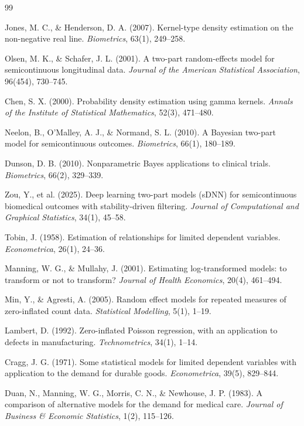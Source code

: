 \begin{thebibliography}{99}

Jones, M. C., \& Henderson, D. A. (2007). Kernel-type density estimation on the non-negative real line. \emph{Biometrics}, 63(1), 249--258.

Olsen, M. K., \& Schafer, J. L. (2001). A two-part random-effects model for semicontinuous longitudinal data. \emph{Journal of the American Statistical Association}, 96(454), 730--745.

Chen, S. X. (2000). Probability density estimation using gamma kernels. \emph{Annals of the Institute of Statistical Mathematics}, 52(3), 471--480.

Neelon, B., O'Malley, A. J., \& Normand, S. L. (2010). A Bayesian two-part model for semicontinuous outcomes. \emph{Biometrics}, 66(1), 180--189.

Dunson, D. B. (2010). Nonparametric Bayes applications to clinical trials. \emph{Biometrics}, 66(2), 329--339.

Zou, Y., et al. (2025). Deep learning two-part models (sDNN) for semicontinuous biomedical outcomes with stability-driven filtering. \emph{Journal of Computational and Graphical Statistics}, 34(1), 45--58.

Tobin, J. (1958). Estimation of relationships for limited dependent variables. \emph{Econometrica}, 26(1), 24--36.

Manning, W. G., \& Mullahy, J. (2001). Estimating log-transformed models: to transform or not to transform? \emph{Journal of Health Economics}, 20(4), 461--494.

Min, Y., \& Agresti, A. (2005). Random effect models for repeated measures of zero-inflated count data. \emph{Statistical Modelling}, 5(1), 1--19.

Lambert, D. (1992). Zero-inflated Poisson regression, with an application to defects in manufacturing. \emph{Technometrics}, 34(1), 1--14.

Cragg, J. G. (1971). Some statistical models for limited dependent variables with application to the demand for durable goods. \emph{Econometrica}, 39(5), 829--844.

Duan, N., Manning, W. G., Morris, C. N., \& Newhouse, J. P. (1983). A comparison of alternative models for the demand for medical care. \emph{Journal of Business \& Economic Statistics}, 1(2), 115--126.


\end{thebibliography}

